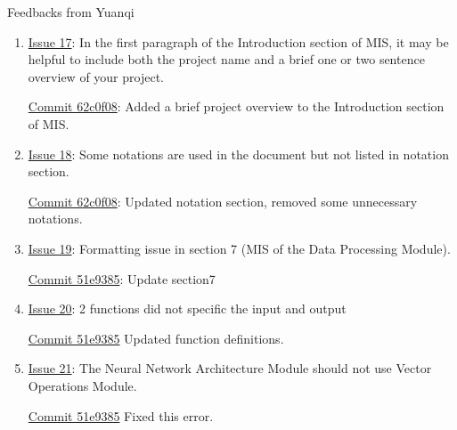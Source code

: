 \documentclass{article}
\begin{document}
Feedbacks from Yuanqi

\begin{enumerate}
    \item \href{https://github.com/V-AS/Two-tower-recommender-system/issues/17}{Issue 17}: In the first paragraph of the Introduction section of MIS, it may be helpful to include both the project name and a brief one or two sentence overview of your project.
    
    \href{https://github.com/V-AS/Two-tower-recommender-system/commit/62c0f08fcc7f92887016aeb634b15b6e7793a360}{Commit 62c0f08}: Added a brief project overview to the Introduction section of MIS.

    \item \href{https://github.com/V-AS/Two-tower-recommender-system/issues/18}{Issue 18}: Some notations are used in the document but not listed in notation section.
    
    \href{https://github.com/V-AS/Two-tower-recommender-system/commit/62c0f08fcc7f92887016aeb634b15b6e7793a360}{Commit 62c0f08}: Updated notation section, removed some unnecessary notations.

    \item \href{https://github.com/V-AS/Two-tower-recommender-system/issues/19}{Issue 19}: Formatting issue in section 7 (MIS of the Data Processing Module).
    
    \href{https://github.com/V-AS/Two-tower-recommender-system/commit/51e9385ee64183b85093d1928ef3424c8759c587}{Commit 51e9385}: Update section7

    \item \href{https://github.com/V-AS/Two-tower-recommender-system/issues/20}{Issue 20}: 2 functions did not specific the input and output
    
    \href{https://github.com/V-AS/Two-tower-recommender-system/commit/51e9385ee64183b85093d1928ef3424c8759c587}{Commit 51e9385} Updated function definitions.

    \item \href{https://github.com/V-AS/Two-tower-recommender-system/issues/21}{Issue 21}: The Neural Network Architecture Module should not use Vector Operations Module.
    
    \href{https://github.com/V-AS/Two-tower-recommender-system/commit/51e9385ee64183b85093d1928ef3424c8759c587}{Commit 51e9385} Fixed this error.
\end{enumerate}
\end{document}
